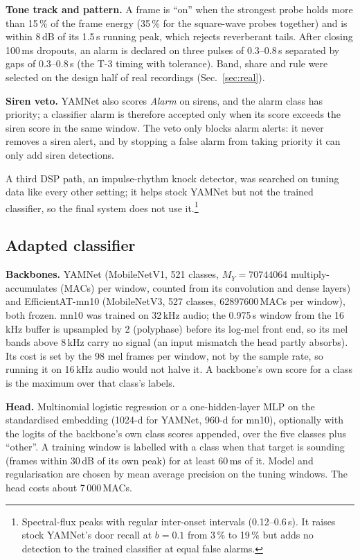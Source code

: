 \documentclass[conference]{IEEEtran}
\begin{document}
\textbf{Tone track and pattern.} A frame is ``on'' when the strongest probe holds more than 15\,\% of the frame energy
(35\,\% for the square-wave probes together) and is within 8\,dB of its 1.5\,s running peak, which rejects reverberant
tails. After closing 100\,ms dropouts, an alarm is declared on three pulses of 0.3--0.8\,s separated by gaps of
0.3--0.8\,s (the T-3 timing with tolerance). Band, share and rule were selected on the design half of real recordings
(Sec.~\ref{sec:real}).

\textbf{Siren veto.} YAMNet also scores \emph{Alarm} on sirens, and the alarm class has priority; a classifier alarm is
therefore accepted only when its score exceeds the siren score in the same window. The veto only blocks alarm alerts:
it never removes a siren alert, and by stopping a false alarm from taking priority it can only add siren detections.

A third DSP path, an impulse-rhythm knock detector, was searched on tuning data like every other setting; it helps stock
YAMNet but not the trained classifier, so the final system does not use it.\footnote{\label{sec:knock}Spectral-flux peaks
with regular inter-onset intervals (0.12--0.6\,s). It raises stock YAMNet's door recall at $b=0.1$ from 3\,\% to 19\,\%
but adds no detection to the trained classifier at equal false alarms.}

\subsection{Adapted classifier}
\textbf{Backbones.} YAMNet (MobileNetV1, 521 classes, $M_Y=\num{70744064}$ multiply-accumulates (MACs) per window, counted
from its convolution and dense layers) and EfficientAT-mn10 (MobileNetV3, 527 classes, \num{62897600}\,MACs per window), both frozen. mn10 was trained on
32\,kHz audio; the 0.975\,s window from the 16\,kHz buffer is upsampled by 2 (polyphase) before its log-mel front end,
so its mel bands above 8\,kHz carry no signal (an input mismatch the head partly absorbs). Its cost is set by the 98 mel
frames per window, not by the sample rate, so running it on 16\,kHz audio would not halve it. A backbone's own score for
a class is the maximum over that class's labels.

\textbf{Head.} Multinomial logistic regression or a one-hidden-layer MLP on the standardised embedding (1024-d for YAMNet,
960-d for mn10), optionally with the logits of the backbone's own class scores appended, over the five classes plus
``other''. A training window is labelled with a class when that target is sounding (frames within 30\,dB of its own peak)
for at least 60\,ms of it. Model and regularisation are chosen by mean average precision on the tuning windows. The head
costs about 7\,000\,MACs.
\end{document}
